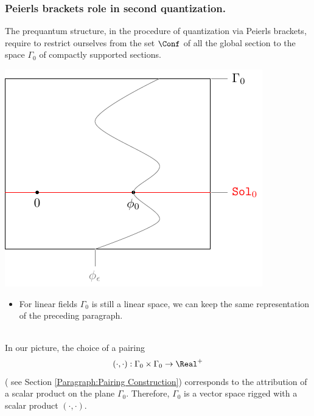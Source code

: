 \documentclass[Main]{subfiles}
\begin{document}
		
		\subsubsection{Peierls brackets role in second quantization.}
		The prequantum structure, in the procedure of quantization via Peierls brackets, require to restrict ourselves from the set $\Conf$ of all the global section to the space $\Gamma_0$ of compactly supported sections.

		\vspace{1mm}		
		\begin{minipage}{0.5\textwidth}
			\includegraphics[width=\textwidth]{Pictures/compsupp_GeometricPicture0}
		\end{minipage}
		\begin{minipage}{0.5\textwidth}
			\begin{itemize}
				\item  For linear fields $\Gamma_0$ is still a linear space, we can keep the same representation of the preceding paragraph.
			\end{itemize}
		\end{minipage}
		\vspace{1mm}\\					

	In our picture, the  choice of a pairing 
	\begin{displaymath}
		( \cdot , \cdot ) : \Gamma_0 \times \Gamma_0 \rightarrow \Real^+
	\end{displaymath}
	 ( see Section \ref{Paragraph:Pairing Construction}) corresponds to the attribution of a scalar product on the plane $\Gamma_0$.
	Therefore, $\Gamma_0$ is a vector space rigged with a scalar product $(\cdot , \cdot)$.\\
\end{document}
